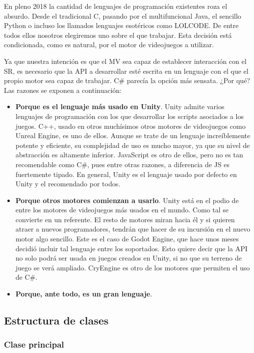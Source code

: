 En pleno 2018 la cantidad de lenguajes de programación existentes roza el absurdo. Desde el tradicional C, pasando por el multifuncional Java, el sencillo Python o incluso los llamados lenguajes esotéricos como LOLCODE\cite{esotericlang}. De entre todos ellos nosotros elegiremos uno sobre el que trabajar. Esta decisión está condicionada, como es natural, por el motor de videojuegos a utilizar.

Ya que nuestra intención es que el MV sea capaz de establecer interacción con el SR, es necesario que la API a desarrollar esté escrita en un lenguaje con el que el propio motor sea capaz de trabajar. C\# parecía la opción más sensata. ¿Por qué? Las razones se exponen a continuación:

\begin{itemize}  
\item\textbf{Porque es el lenguaje más usado en Unity}. Unity admite varios lenguajes de programación con los que desarrollar los scripts asociados a los juegos. C++, usado en otros muchísimos otros motores de videojuegos como Unreal Engine, es uno de ellos. Aunque se trate de un lenguaje increíblemente potente y eficiente, su complejidad de uso es mucho mayor, ya que su nivel de abstracción es altamente inferior. JavaScript es otro de ellos, pero no es tan recomendable como C\#, pues entre otras razones, a diferencia de JS es fuertemente tipado\cite{unityinaction}. En general, Unity es el lenguaje usado por defecto en Unity y el recomendado por todos.
\item\textbf{Porque otros motores comienzan a usarlo}. Unity está en el podio de entre los motores de videojuegos más usados en el mundo. Como tal se convierte en un referente. El resto de motores miran hacia él y si quieren atraer a nuevos programadores, tendrán que hacer de su incursión en el nuevo motor algo sencillo. Este es el caso de Godot Engine, que hace unos meses decidió incluir tal lenguaje entre los soportados\cite{godotcs}. Esto quiere decir que la API no solo podrá ser usada en juegos creados en Unity, si no que su terreno de juego se verá ampliado. CryEngine es otro de los motores que permiten el uso de C\#.
\item\textbf{Porque, ante todo, es un gran lenguaje}. 
\end{itemize}

\subsection{Estructura de clases}
\subsubsection[''GNS3sharp'']{Clase principal}
